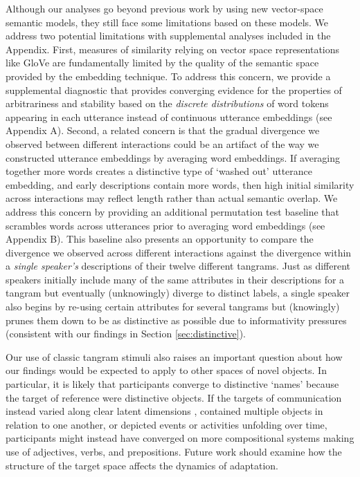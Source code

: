 \documentclass[alpha-refs]{wiley-article}
\begin{document}
Although our analyses go beyond previous work by using new vector-space semantic models, they still face some limitations based on these models.
We address two potential limitations with supplemental analyses included in the Appendix.
First, measures of similarity relying on vector space representations like GloVe are fundamentally limited by the quality of the semantic space provided by the embedding technique.
To address this concern, we provide a supplemental diagnostic that provides converging evidence for the properties of arbitrariness and stability based on the \emph{discrete distributions} of word tokens appearing in each utterance instead of continuous utterance embeddings (see Appendix A).
Second, a related concern is that the gradual divergence we observed between different interactions could be an artifact of the way we constructed utterance embeddings by averaging word embeddings.
If averaging together more words creates a distinctive type of `washed out' utterance embedding, and early descriptions contain more words, then high initial similarity across interactions may reflect length rather than actual semantic overlap.
We address this concern by providing an additional permutation test baseline that scrambles words across utterances prior to averaging word embeddings (see Appendix B).
This baseline also presents an opportunity to compare the divergence we observed across different interactions against the divergence within a \emph{single speaker's} descriptions of their twelve different tangrams.
Just as different speakers initially include many of the same attributes in their descriptions for a tangram but eventually (unknowingly) diverge to distinct labels, a single speaker also begins by re-using certain attributes for several tangrams but (knowingly) prunes them down to be as distinctive as possible due to informativity pressures (consistent with our findings in Section \ref{sec:distinctive}).


Our use of classic tangram stimuli also raises an important question about how our findings would be expected to apply to other spaces of novel objects.
In particular, it is likely that participants converge to distinctive `names' because the target of reference were distinctive objects.
If the targets of communication instead varied along clear latent dimensions \citep[e.g.][]{nolle2018emergence}, contained multiple objects in relation to one another, or depicted events or activities unfolding over time, participants might instead have converged on more compositional systems making use of adjectives, verbs, and prepositions.
Future work should examine how the structure of the target space affects the dynamics of adaptation.
\end{document}
